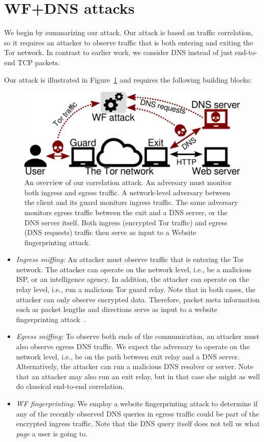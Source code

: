 \section{WF+DNS attacks}
\label{sec:attack}
We begin by summarizing our attack.  Our attack is based on traffic correlation,
so it requires an attacker to observe traffic that is both entering and exiting
the Tor network.  In contrast to earlier work, we consider DNS instead of just
end-to-end TCP packets.

Our attack is illustrated in Figure~\ref{fig:attack-scenario} and requires the
following building blocks:
\begin{figure}[t]
	\centering
	\includegraphics[width=0.8\linewidth]{figures/attack-scenario.pdf}
	\caption{An overview of our correlation attack.  An adversary must monitor
		both ingress and egress traffic.  A network-level adversary between the
		client and its guard monitors ingress traffic.  The same adversary
		monitors egress traffic between the exit and a DNS server, or the DNS
		server itself.  Both ingress (encrypted Tor traffic) and egress (DNS
		requests) traffic then serve as input to a Website fingerprinting
		attack.}
	\label{fig:attack-scenario}
\end{figure}

\begin{itemize}
    \item \emph{Ingress sniffing:} An attacker must observe traffic that is entering
		the Tor network.  The attacker can operate on the network level, i.e.,
		be a malicious ISP, or an intelligence agency.  In addition, the
		attacker can operate on the relay level, i.e., run a malicious Tor guard
		relay.  Note that in both cases, the attacker can only observe encrypted
		data.  Therefore, packet meta information such as packet lengths and
		directions serve as input to a website fingerprinting
		attack~\cite{Panchenko2016a}.
    \item \emph{Egress sniffing:} To observe both ends of the communication, an
		attacker must also observe egress DNS traffic.  We expect the adversary
		to operate on the network level, i.e., be on the path between exit relay
		and a DNS server.  Alternatively, the attacker can run a malicious DNS
		resolver or server.  Note that an attacker may also run an exit relay,
		but in that case she might as well do classical end-to-end correlation.
    \item \emph{WF fingerprinting:} We employ a website fingerprinting attack to
		determine if any of the recently observed DNS queries in egress traffic
		could be part of the encrypted ingress traffic.  Note that the DNS query
		itself does not tell us what \emph{page} a user is going to.
\end{itemize}

